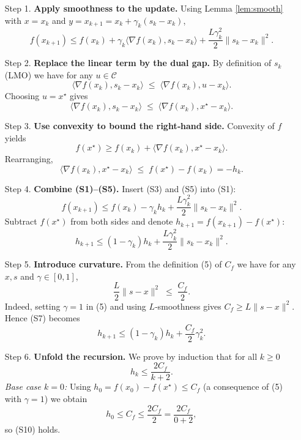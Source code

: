 \documentclass{article}
\newcommand{\Cset}{\mathcal{C}}
\newcommand{\opt}{x^{\star}}
\newcommand{\grad}{\nabla}
\newcommand{\inner}[2]{\langle #1,#2\rangle}
\newcommand{\norm}[1]{\|#1\|}
\begin{document}
\begin{enumerate}
\item[Step 1.] \textbf{Apply smoothness to the update.}  
Using Lemma \ref{lem:smooth} with $x=x_{k}$ and $y=x_{k+1}=x_{k}+\gamma_{k}(s_{k}-x_{k})$,
\[
f(x_{k+1})\le f(x_{k})+\gamma_{k}\inner{\grad f(x_{k})}{s_{k}-x_{k}}
+\frac{L\gamma_{k}^{2}}{2}\norm{s_{k}-x_{k}}^{2}.
\tag{S1}
\]

\item[Step 2.] \textbf{Replace the linear term by the dual gap.}  
By definition of $s_{k}$ (LMO) we have for any $u\in\Cset$
\[
\inner{\grad f(x_{k})}{s_{k}-x_{k}}\;\le\; \inner{\grad f(x_{k})}{u-x_{k}}.
\tag{S2}
\]
Choosing $u=\opt$ gives
\[
\inner{\grad f(x_{k})}{s_{k}-x_{k}}\;\le\;\inner{\grad f(x_{k})}{\opt-x_{k}}.
\tag{S3}
\]

\item[Step 3.] \textbf{Use convexity to bound the right‑hand side.}  
Convexity of $f$ yields
\[
f(\opt)\ge f(x_{k})+\inner{\grad f(x_{k})}{\opt-x_{k}}.
\tag{S4}
\]
Rearranging,
\[
\inner{\grad f(x_{k})}{\opt-x_{k}}\;\le\; f(\opt)-f(x_{k})=-h_{k}.
\tag{S5}
\]

\item[Step 4.] \textbf{Combine (S1)–(S5).}  
Insert (S3) and (S5) into (S1):
\[
f(x_{k+1})\le f(x_{k})-\gamma_{k}h_{k}+\frac{L\gamma_{k}^{2}}{2}\norm{s_{k}-x_{k}}^{2}.
\tag{S6}
\]
Subtract $f(\opt)$ from both sides and denote $h_{k+1}=f(x_{k+1})-f(\opt)$:
\[
h_{k+1}\le (1-\gamma_{k})h_{k}+\frac{L\gamma_{k}^{2}}{2}\norm{s_{k}-x_{k}}^{2}.
\tag{S7}
\]

\item[Step 5.] \textbf{Introduce curvature.}  
From the definition (5) of $C_{f}$ we have for any $x,s$ and $\gamma\in[0,1]$,
\[
\frac{L}{2}\norm{s-x}^{2}\;\le\;\frac{C_{f}}{2}.
\tag{S8}
\]
Indeed, setting $\gamma=1$ in (5) and using $L$‑smoothness gives $C_{f}\ge L\norm{s-x}^{2}$.  Hence (S7) becomes
\[
h_{k+1}\le (1-\gamma_{k})h_{k}+\frac{C_{f}}{2}\gamma_{k}^{2}.
\tag{S9}
\]

\item[Step 6.] \textbf{Unfold the recursion.}  
We prove by induction that for all $k\ge0$
\[
h_{k}\le \frac{2C_{f}}{k+2}.
\tag{S10}
\]
\emph{Base case $k=0$:}  Using $h_{0}=f(x_{0})-f(\opt)\le C_{f}$ (a consequence of (5) with $\gamma=1$) we obtain
\[
h_{0}\le C_{f}\le \frac{2C_{f}}{2}= \frac{2C_{f}}{0+2},
\]
so (S10) holds.


\end{enumerate}
\end{document}
